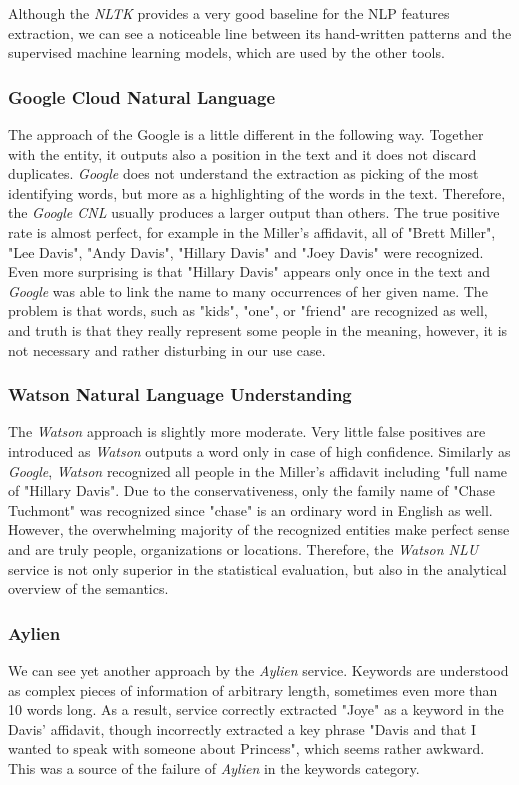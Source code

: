 \documentclass[
  digital, %
  table,   %
  lof,     %
  lot,     %
]{fithesis3}
\begin{document}
Although the \textit{NLTK} provides a very good baseline for the NLP features extraction, we can see a noticeable line between its hand-written patterns and the supervised machine learning models, which are used by the other tools.

\subsubsection{\textbf{Google Cloud Natural Language}}
The approach of the Google is a little different in the following way.
Together with the entity, it outputs also a position in the text and it does not discard duplicates.
\textit{Google} does not understand the extraction as picking of the most identifying words, but more as a highlighting of the words in the text.
Therefore, the \textit{Google CNL} usually produces a larger output than others.
The true positive rate is almost perfect, for example in the Miller's affidavit, all of "Brett Miller", "Lee Davis", "Andy Davis", "Hillary Davis" and "Joey Davis" were recognized.
Even more surprising is that "Hillary Davis" appears only once in the text and \textit{Google} was able to link the name to many occurrences of her given name.
The problem is that words, such as "kids", "one", or "friend" are recognized as well, and truth is that they really represent some people in the meaning, however, it is not necessary and rather disturbing in our use case.

\subsubsection{\textbf{Watson Natural Language Understanding}}
The \textit{Watson} approach is slightly more moderate.
Very little false positives are introduced as \textit{Watson} outputs a word only in case of high confidence.
Similarly as \textit{Google}, \textit{Watson} recognized all people in the Miller's affidavit including "full name of "Hillary Davis".
Due to the conservativeness, only the family name of "Chase Tuchmont" was recognized since "chase" is an ordinary word in English as well.
However, the overwhelming majority of the recognized entities make perfect sense and are truly people, organizations or locations.
Therefore, the \textit{Watson NLU} service is not only superior in the statistical evaluation, but also in the analytical overview of the semantics.

\subsubsection{\textbf{Aylien}}
We can see yet another approach by the \textit{Aylien} service.
Keywords are understood as complex pieces of information of arbitrary length, sometimes even more than 10 words long.
As a result, service correctly extracted "Joye" as a keyword in the Davis' affidavit, though incorrectly extracted a key phrase "Davis and that I wanted to speak with someone about Princess", which seems rather awkward.
This was a source of the failure of \textit{Aylien} in the keywords category.
\end{document}
